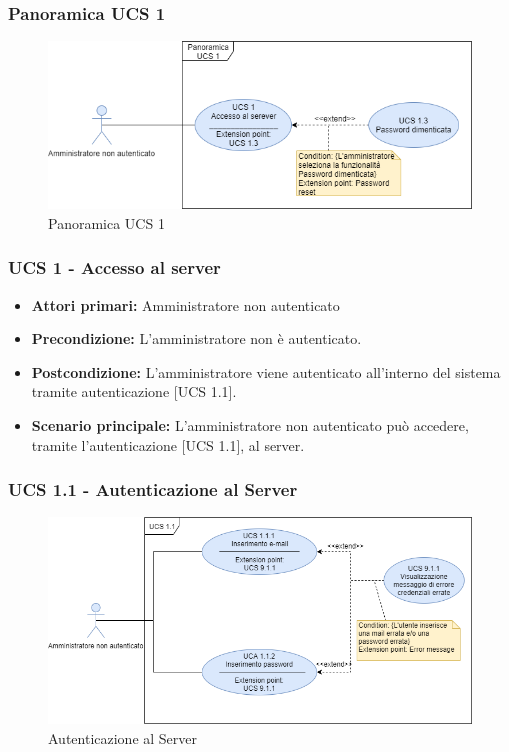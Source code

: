 \subsubsection{Panoramica UCS 1}%

\begin{figure}[h]
  \centering
    \includegraphics[scale=0.67]{sezioni/UseCase/Immagini/PanoramicaUCS1.png}
  \caption{Panoramica UCS 1}
\end{figure}

\subsubsection{UCS 1 - Accesso al server}%

\begin{itemize}
\item \textbf{Attori primari:} Amministratore non autenticato
\item \textbf{Precondizione:} L'amministratore non è autenticato.
\item \textbf{Postcondizione:} L'amministratore viene autenticato all'interno del sistema tramite autenticazione [UCS 1.1].
\item \textbf{Scenario principale:} L'amministratore non autenticato può accedere, tramite l'autenticazione [UCS 1.1], al server. 
\end{itemize}

\subsubsection{UCS 1.1 - Autenticazione al Server}

\begin{figure}[h]
    \centering
    \includegraphics[scale=0.6]{sezioni/UseCase/Immagini/UCS1.1.png}
    \caption{Autenticazione al Server}
\end{figure}


